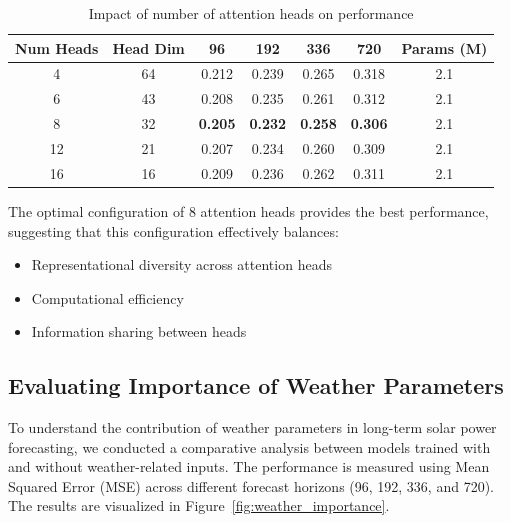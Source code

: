 \documentclass[12pt]{uomthesis}
\begin{document}
\begin{table}[h]
\centering
\caption{Impact of number of attention heads on performance}
\begin{tabular}{ccccccc}
\toprule
\textbf{Num Heads} & \textbf{Head Dim} & \textbf{96} & \textbf{192} & \textbf{336} & \textbf{720} & \textbf{Params (M)} \\
\midrule
4 & 64 & 0.212 & 0.239 & 0.265 & 0.318 & 2.1 \\
6 & 43 & 0.208 & 0.235 & 0.261 & 0.312 & 2.1 \\
8 & 32 & \textbf{0.205} & \textbf{0.232} & \textbf{0.258} & \textbf{0.306} & 2.1 \\
12 & 21 & 0.207 & 0.234 & 0.260 & 0.309 & 2.1 \\
16 & 16 & 0.209 & 0.236 & 0.262 & 0.311 & 2.1 \\
\bottomrule
\end{tabular}
\label{tab:attention_heads}
\end{table}

The optimal configuration of 8 attention heads provides the best performance, suggesting that this configuration effectively balances:
\begin{itemize}
\item Representational diversity across attention heads
\item Computational efficiency 
\item Information sharing between heads
\end{itemize}

\subsection{Evaluating Importance of Weather Parameters}

To understand the contribution of weather parameters in long-term solar power forecasting, we conducted a comparative analysis between models trained with and without weather-related inputs. The performance is measured using Mean Squared Error (MSE) across different forecast horizons (96, 192, 336, and 720). The results are visualized in Figure~\ref{fig:weather_importance}.

\end{document}
